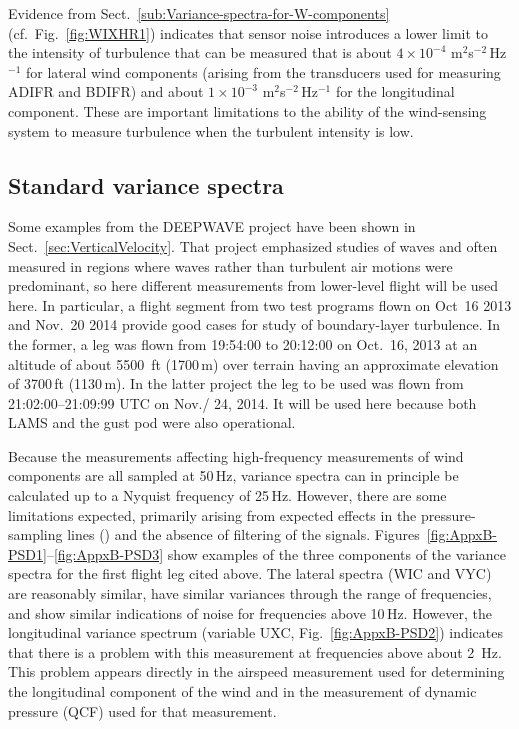 \documentclass[12pt,twoside,english]{article}\usepackage[]{graphicx}\usepackage[]{color}
\let\OrgIndex\index
\renewcommand*{\index}[1]{\OrgIndex{#1}}
\begin{document}
Evidence from Sect.~\ref{sub:Variance-spectra-for-W-components} (cf.~Fig.~\ref{fig:WIXHR1}) indicates that sensor noise introduces a lower limit to the intensity of turbulence that can be measured that is about $4\times10^{-4}$ m$^{2}$s$^{-2}$\,Hz$^{-1}$ for lateral wind components (arising from the transducers used for measuring ADIFR and BDIFR) and about $1\times10^{-3}$ m$^{2}$s$^{-2}$\,Hz$^{-1}$ for the longitudinal component. These are important limitations to the ability of the wind-sensing system to measure turbulence when the turbulent intensity is low. 


\subsection{Standard variance spectra\label{sub:var-spec}}

Some examples from the DEEPWAVE project have been shown in Sect.~\ref{sec:VerticalVelocity}. That project emphasized studies of waves and often measured in regions where waves rather than turbulent air motions were predominant, so here different measurements from lower-level flight will be used here. In particular, a flight segment from two test programs flown on Oct~16 2013 and Nov.~20 2014 provide good cases for study of boundary-layer turbulence. In the former, a leg was flown from 19:54:00 to 20:12:00 on Oct.\ 16, 2013 at an altitude of about 5500~ft (1700\,m) over terrain having an approximate elevation of 3700\,ft (1130\,m). In the latter project the leg to be used was flown from 21:02:00--21:09:99 UTC on Nov./ 24, 2014. It will be used here because both LAMS and the gust pod were also operational. 



Because the measurements affecting high-frequency measurements of wind components are all sampled at 50\,Hz, variance spectra can in principle be calculated up to a Nyquist frequency of 25\,Hz. However, there are some limitations expected, primarily arising from expected effects in the pressure-sampling lines (\citet{Iberall1950}) and the absence of filtering of the signals. Figures\ \ref{fig:AppxB-PSD1}--\ref{fig:AppxB-PSD3} show examples of the three components of the variance spectra for the first flight leg cited above. The lateral spectra (WIC and VYC) are reasonably similar, have similar variances through the range of frequencies, and show similar indications of noise for frequencies above 10\,Hz. However, the longitudinal variance spectrum (variable UXC, Fig.~\ref{fig:AppxB-PSD2}) indicates that there is a problem with this measurement at frequencies above about 2~Hz. This problem appears directly in the airspeed measurement used for determining the longitudinal component of the wind and in the measurement of dynamic pressure (QCF) used for that measurement. 
\end{document}
